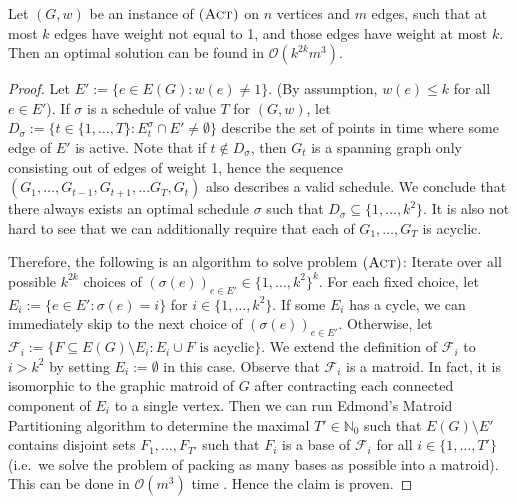 \documentclass[runningheads]{llncs}
\numberwithin{equation}{section}
\newcommand{\N}{\mathbb{N}}
\newcommand{\set}[1]{\{ #1 \}}
\newcommand{\fromto}[2]{\set{#1, \ldots, #2}}
\newcommand{\comment}[1]{\textcolor{red}{(L: #1)}}
\newcommand{\bigO}{\mathcal{O}}
\newcommand{\act}{\textsc{(Act)}}
\begin{document}
\begin{theorem}
Let $(G, w)$ be an instance of $\act$ on $n$ vertices and $m$ edges, such that at most $k$ edges have weight not equal to 1, and those edges have weight at most $k$. Then an optimal solution can be found in $\bigO(k^{2k}m^3)$.
\end{theorem}

\begin{proof}
Let $E' := \set{e \in E(G) : w(e) \neq 1}$. (By assumption, $w(e) \leq k$ for all $e \in E'$). If $\sigma$ is a schedule of value $T$ for $(G, w)$,  let $D_\sigma := \set{t \in \fromto{1}{T} : E_t^\sigma \cap E' \neq \emptyset}$ describe the set of points in time where some edge of $E'$ is active. Note that  if $t \not\in D_\sigma$, then $G_t$ is a spanning graph only consisting out of edges of weight 1, hence the sequence $(G_1, \dots, G_{t-1}, G_{t+1}, \dots G_T, G_t)$ also describes a valid schedule. We conclude that there always exists an optimal schedule $\sigma$ such that $D_\sigma \subseteq \fromto{1}{k^2}$. It is also not  hard to see that we can additionally require that each of $G_1, \dots, G_T$ is acyclic.

Therefore, the following is an algorithm to solve problem $\act$: Iterate over all possible $k^{2k}$ choices of $(\sigma(e))_{e \in E'} \in \fromto{1}{k^2}^k$. For each fixed choice, let $E_i := \set{e \in E' : \sigma(e) = i}$ for $i \in \fromto{1}{k^2}$. If some $E_i$ has a cycle, we can immediately skip to the next choice of $(\sigma(e))_{e \in E'}$. Otherwise, let $\mathcal{F}_i := \set{F \subseteq E(G) \setminus E_i : E_i \cup F \text{ is acyclic}}$. We extend the definition of $\mathcal{F}_i$ to $i > k^2$ by setting $E_i := \emptyset$ in this case. Observe that $\mathcal{F}_i$ is a matroid. In fact, it is isomorphic to the graphic matroid of $G$ after contracting each connected component of $E_i$ to a single vertex. Then we can run
 Edmond's Matroid Partitioning algorithm to determine the maximal $T' \in \N_0$ such that $E(G) \setminus E'$ contains disjoint sets $F_1, \dots, F_{T'}$ such that $F_i$ is a base of $\mathcal{F}_i$ for all $i \in \fromto{1}{T'}$ (i.e.\ we solve the problem of packing as many bases as possible into a matroid). This can be done in $\bigO(
m^3)$ time \cite{edmonds1965minimum}. Hence the claim is proven.

\end{proof}
\end{document}
